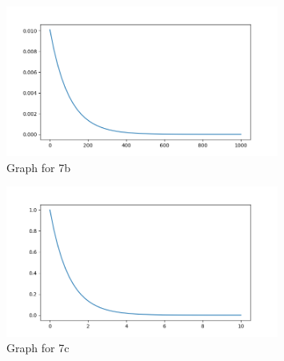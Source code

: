 \documentclass[letterpaper, reqno,11pt]{article}
\begin{document}
\begin{figure}[htpb]
    \centering
    \includegraphics[width=0.8\textwidth]{b}
    \caption{Graph for 7b}
    \label{fig:b}
\end{figure}

\begin{figure}[htpb]
    \centering
    \includegraphics[width=0.8\textwidth]{c}
    \caption{Graph for 7c}
    \label{fig:c}
\end{figure}
\end{document}
